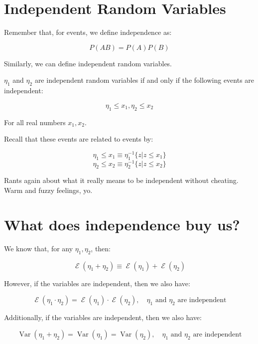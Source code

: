 \documentclass{article}
\newcommand{\inv}[1]{#1^{-1}}
\DeclareMathOperator{\var}{Var}
\DeclareMathOperator{\E}{\mathcal{E}}
\begin{document}
\section*{Independent Random Variables}

Remember that, for events, we define independence as:

\[
P(AB)=P(A)P(B)
\]

Similarly, we can define independent random variables.

$\eta_1$ and $\eta_2$ are independent random variables if and only if
the following events are independent:

\[
\eta_1\le x_1, \eta_2\le x_2
\]

For all real numbers $x_1,x_2$.

Recall that these events are related to events by:

\[
\eta_1\le x_1\equiv \inv{\eta_1}\{z|z\le x_1\}
\] \[
\eta_2\le x_2\equiv \inv{\eta_2}\{z|z\le x_2\}
\]

Rants again about what it really means to be independent without
cheating. Warm and fuzzy feelings, yo.

\section*{What does independence buy us?}

We know that, for any $\eta_1,\eta_2$, then:

\[
\E(\eta_1+\eta_2)\equiv \E(\eta_1)+\E(\eta_2)
\]

However, if the variables are independent, then we also have:

\[
\E(\eta_1\cdot\eta_2)=\E(\eta_1)\cdot\E(\eta_2),\quad \text{$\eta_1$ and $\eta_2$ are independent}
\]

Additionally, if the variables are independent, then we also have:

\[
\var(\eta_1+\eta_2)=\var(\eta_1)=\var(\eta_2),\quad \text{$\eta_1$ and $\eta_2$ are independent}
\]
\end{document}
